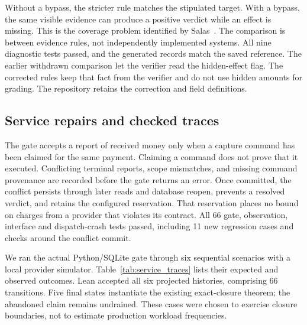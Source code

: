 \documentclass[letterpaper]{article}
\begin{document}
Without a bypass, the stricter rule matches the stipulated target. With a
bypass, the same visible evidence can produce a positive verdict while an
effect is missing. This is the coverage problem identified by
Salas~\citep{salas}. The comparison is between evidence rules, not independently
implemented systems. All nine diagnostic tests passed, and the generated
records match the saved reference. The earlier withdrawn comparison let the
verifier read the hidden-effect flag. The corrected rules keep that fact from
the verifier and do not use hidden amounts for grading. The repository retains
the correction and field definitions.

\subsection{Service repairs and checked traces}
\label{sec:service_checks}
The gate accepts a report of received money only when a capture command has
been claimed for the same payment. Claiming a command does not prove that it
executed. Conflicting terminal reports, scope mismatches, and missing command
provenance are recorded before the gate returns an error. Once committed, the
conflict persists through later reads and database reopen, prevents a resolved
verdict, and retains the configured reservation. That reservation places no
bound on charges from a provider that violates its contract. All 66 gate,
observation, interface and dispatch-crash tests passed, including 11 new
regression cases and checks around the conflict commit.

We ran the actual Python/SQLite gate through six sequential scenarios with a
local provider simulator. Table~\ref{tab:service_traces} lists their expected
and observed outcomes. Lean accepted all six projected histories, comprising
66 transitions. Five final states instantiate the existing exact-closure
theorem; the abandoned claim remains undrained. These cases were chosen to
exercise closure boundaries, not to estimate production workload frequencies.
\end{document}
